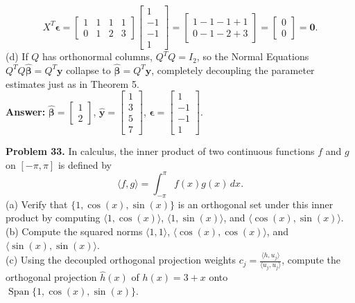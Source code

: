 \documentclass[11pt, letterpaper]{article}
\theoremstyle{definition}
\theoremstyle{remark}
\begin{document}
\[
X^T \boldsymbol{\epsilon} = \begin{bmatrix} 1 & 1 & 1 & 1 \\ 0 & 1 & 2 & 3 \end{bmatrix}\begin{bmatrix} 1 \\ -1 \\ -1 \\ 1 \end{bmatrix} = \begin{bmatrix} 1 - 1 - 1 + 1 \\ 0 - 1 - 2 + 3 \end{bmatrix} = \begin{bmatrix} 0 \\ 0 \end{bmatrix} = \mathbf{0}.
\]
(d) If $Q$ has orthonormal columns, $Q^T Q = I_2$, so the Normal Equations $Q^T Q \hat{\boldsymbol{\beta}} = Q^T \mathbf{y}$ collapse to $\hat{\boldsymbol{\beta}} = Q^T \mathbf{y}$, completely decoupling the parameter estimates just as in Theorem 5. \\
\textbf{Answer:} $\hat{\boldsymbol{\beta}} = \begin{bmatrix} 1 \\ 2 \end{bmatrix}$, $\hat{\mathbf{y}} = \begin{bmatrix} 1 \\ 3 \\ 5 \\ 7 \end{bmatrix}$, $\boldsymbol{\epsilon} = \begin{bmatrix} 1 \\ -1 \\ -1 \\ 1 \end{bmatrix}$.

\textbf{Problem 33.} In calculus, the inner product of two continuous functions $f$ and $g$ on $[-\pi, \pi]$ is defined by
\[
\langle f, g \rangle = \int_{-\pi}^{\pi} f(x)g(x)\,dx.
\]
(a) Verify that $\{1, \cos(x), \sin(x)\}$ is an orthogonal set under this inner product by computing $\langle 1, \cos(x) \rangle$, $\langle 1, \sin(x) \rangle$, and $\langle \cos(x), \sin(x) \rangle$. \\
(b) Compute the squared norms $\langle 1, 1 \rangle$, $\langle \cos(x), \cos(x) \rangle$, and $\langle \sin(x), \sin(x) \rangle$. \\
(c) Using the decoupled orthogonal projection weights $c_j = \frac{\langle h, u_j \rangle}{\langle u_j, u_j \rangle}$, compute the orthogonal projection $\hat{h}(x)$ of $h(x) = 3 + x$ onto $\operatorname{Span}\{1, \cos(x), \sin(x)\}$.
\end{document}
